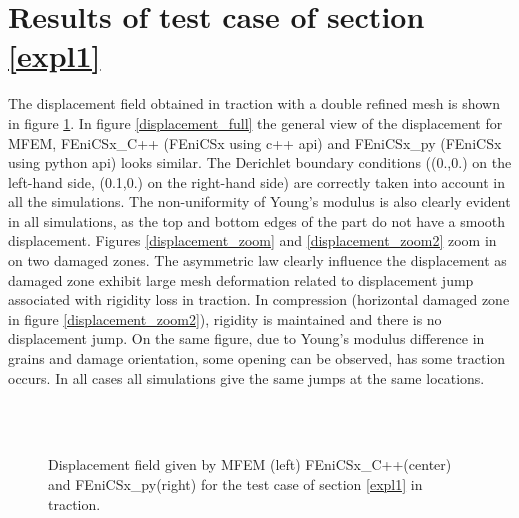 \documentclass[12pt]{article}
\newcommand{\f}[1]{FEniCSx#1}
\begin{document}
\section{Results of test case of section \ref{expl1} }
The displacement field obtained in traction with a double refined mesh is shown in figure \ref{displacement}. 
In figure \ref{displacement_full} the general view of the displacement for MFEM, \f{\_C++} (\f{} using c++ api) and \f{\_py}  (\f{} using python api) looks similar.
The Derichlet boundary conditions ((0.,0.) on the left-hand side, (0.1,0.) on the right-hand side) are correctly taken into account in all the simulations. 
The non-uniformity of Young's modulus is also clearly evident in all simulations, as the top and bottom edges of the part do not have a smooth displacement. 
Figures \ref{displacement_zoom} and \ref{displacement_zoom2} zoom in on two damaged zones. 
The asymmetric law clearly influence the displacement as damaged zone exhibit large mesh deformation related to displacement jump associated with rigidity loss in traction.
 In compression (horizontal damaged zone in figure \ref{displacement_zoom2}), rigidity is maintained and there is no displacement jump. On the same figure, due to Young's modulus difference in grains and damage orientation, some opening can be observed, has some traction occurs.
 In all cases all simulations give the same jumps at the same locations. 
\begin{figure}
		\\
	\\
	\caption{Displacement field given by MFEM (left) \f{\_C++}(center) and \f{\_py}(right) for the test case of section \ref{expl1} in traction.\label{displacement}}
\end{figure}
\end{document}
